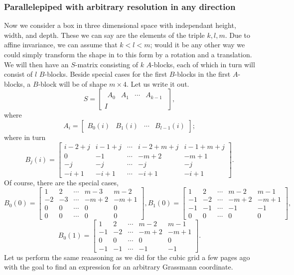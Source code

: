 \documentclass[a4paper,12pt]{book}
\theoremstyle{plain}
\theoremstyle{definition}
\begin{document}
\subsubsection{Parallelepiped with arbitrary resolution in any direction}
Now we consider a box in three dimensional space with independant height,
width, and depth. These we can say are the elements of the triple 
\( k, l, m \). Due to affine invariance, we can assume that \( k < l < m \);
would it be any other way we could simply transform the shape in to this form
by a rotation and a translation.
We will then have an \( S \)-matrix consisting of \( k \) \( A \)-blocks,
each of which in turn will consist of \( l \) \( B \)-blocks. Beside special
cases for the first \( B \)-blocks in the first \( A \)-blocks, a \( B \)-block
will be of shape \( m \times 4 \). Let us write it out.
\[
	S = \begin{bmatrix}
		\begin{matrix}
			A_0 & A_1 & \cdots & A_{k - 1}
		\end{matrix} \\
		I
	\end{bmatrix},
\]
where
\[
	A_i = \begin{bmatrix}
		B_0(i) & B_1(i) & \cdots & B_{l - 1}(i)
	\end{bmatrix};
\]
where in turn
\[
	B_j(i) = \begin{bmatrix}
		i - 2 + j & i - 1 + j & \cdots & i - 2 + m + j & i - 1 + m + j \\
		0 & -1 & \cdots & -m + 2 & -m + 1 \\
		-j & -j & \cdots & -j & -j \\
		-i + 1 & -i + 1 & \cdots & -i + 1 & -i + 1
	\end{bmatrix}.
\]
Of course, there are the special cases,
\[
	B_0(0) = \begin{bmatrix}
		1 & 2 & \cdots & m - 3 & m - 2 \\
		-2 & -3 & \cdots & -m + 2 & -m + 1 \\
		0 & 0 & \cdots & 0 & 0 \\
		0 & 0 & \cdots & 0 & 0
	\end{bmatrix},
	B_1(0) = \begin{bmatrix}
		1 & 2 & \cdots & m - 2 & m - 1 \\
		-1 & -2 & \cdots & -m + 2 & -m + 1 \\
		-1 & -1 & \cdots & -1 & -1 \\
		0 & 0 & \cdots & 0 & 0
	\end{bmatrix},
\]
\[
	B_0(1) = \begin{bmatrix}
		1 & 2 & \cdots & m - 2 & m - 1 \\
		-1 & -2 & \cdots & -m + 2 & -m + 1 \\
		0 & 0 & \cdots & 0 & 0 \\
		-1 & -1 & \cdots & -1 & -1
\end{bmatrix}.
\]
Let us perform the same reaasoning as we did for the cubic grid a few 
pages ago with
the goal to find an expression for an arbitrary Grassmann coordinate.
\end{document}
